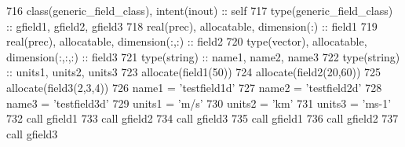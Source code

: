 \begin{DoxyCode}
716     \textcolor{keywordtype}{class}(generic\_field\_class), \textcolor{keywordtype}{intent(inout)} :: self
717     \textcolor{keywordtype}{type}(generic\_field\_class) :: gfield1, gfield2, gfield3
718     \textcolor{keywordtype}{real(prec)}, \textcolor{keywordtype}{allocatable}, \textcolor{keywordtype}{dimension(:)} :: field1
719     \textcolor{keywordtype}{real(prec)}, \textcolor{keywordtype}{allocatable}, \textcolor{keywordtype}{dimension(:,:)} :: field2
720     \textcolor{keywordtype}{type}(vector), \textcolor{keywordtype}{allocatable}, \textcolor{keywordtype}{dimension(:,:,:)} :: field3
721     \textcolor{keywordtype}{type}(string) :: name1, name2, name3
722     \textcolor{keywordtype}{type}(string) :: units1, units2, units3
723     \textcolor{keyword}{allocate}(field1(50))
724     \textcolor{keyword}{allocate}(field2(20,60))
725     \textcolor{keyword}{allocate}(field3(2,3,4))
726     name1 = \textcolor{stringliteral}{'testfield1d'}
727     name2 = \textcolor{stringliteral}{'testfield2d'}
728     name3 = \textcolor{stringliteral}{'testfield3d'}
729     units1 = \textcolor{stringliteral}{'m/s'}
730     units2 = \textcolor{stringliteral}{'km'}
731     units3 = \textcolor{stringliteral}{'ms-1'}
732     \textcolor{keyword}{call }gfield1%
733     \textcolor{keyword}{call }gfield2%
734     \textcolor{keyword}{call }gfield3%
735     \textcolor{keyword}{call }gfield1%
736     \textcolor{keyword}{call }gfield2%
737     \textcolor{keyword}{call }gfield3%
\end{DoxyCode}
